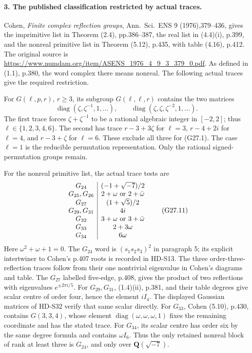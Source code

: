 \paragraph{3. The published classification restricted by actual traces.}
Cohen, \emph{Finite complex reflection groups},
Ann.\ Sci.\ ENS 9 (1976),379--436, gives the imprimitive list
in Theorem (2.4), pp.386--387, the real list in (4.4)(i),
p.399, and the nonreal primitive list in Theorem (5.12),
p.435, with table (4.16), p.412. The original source is
\url{https://www.numdam.org/item/ASENS_1976_4_9_3_379_0.pdf}.
As defined in (1.1), p.380, the word complex there means
nonreal. The following actual traces give the required restriction.

For \(G(\ell,p,r)\), \(r\ge3\), its subgroup
\(G(\ell,\ell,r)\) contains the two matrices
\[
 \operatorname{diag}(\zeta,\zeta^{-1},1,\ldots),\qquad
 \operatorname{diag}(\zeta,\zeta,\zeta^{-2},1,\ldots).
\]
The first trace forces \(\zeta+\zeta^{-1}\) to be a rational
algebraic integer in \([-2,2]\); thus
\(\ell\in\{1,2,3,4,6\}\).
The second has trace \(r-3+3\zeta\) for \(\ell=3\),
\(r-4+2i\) for \(\ell=4\), and \(r-3+\zeta\) for
\(\ell=6\). These exclude all three for (G27.1).
The case \(\ell=1\) is the reducible permutation representation.
Only the rational signed-permutation groups remain.

For the nonreal primitive list, the actual trace tests are
\[
\begin{array}{c|c}
G_{24}&(-1+\sqrt{-7})/2\\
G_{25},G_{26}&2+\omega\ \hbox{or }2+\bar\omega\\
G_{27}&(1+\sqrt5)/2\\
G_{29},G_{31}&4i\\
G_{32}&3+\omega\ \hbox{or }3+\bar\omega\\
G_{33}&2+3\omega\\
G_{34}&6\omega
\end{array}                                                    \tag{G27.11}
\]
Here \(\omega^2+\omega+1=0\).
The \(G_{24}\) word is \((s_1s_2s_3)^2\) in paragraph 5;
its explicit intertwiner to Cohen's p.407 roots is recorded
in HD-S13. The three order-three-reflection traces follow from
their one nontrivial eigenvalue in Cohen's diagrams and table.
The \(G_{27}\) labelled five-edge, p.408, gives the product
of two reflections with eigenvalues \(e^{\pm2\pi i/5}\).
For \(G_{29},G_{31}\), (1.4)(ii), p.381, and their table
degrees give scalar centre of order four, hence the element
\(iI_4\). The displayed Gaussian matrices of HD-S32 verify
that same scalar directly.
For \(G_{33}\), Cohen (5.10), p.430, contains
\(G(3,3,4)\), whose element
\(\operatorname{diag}(\omega,\omega,\omega,1)\) fixes the
remaining coordinate and has the stated trace.
For \(G_{34}\), its scalar centre has order six by the same
degree formula and contains \(\omega I_6\).
Thus the only retained nonreal block of rank at least three
is \(G_{24}\), and only over \(\mathbf Q(\sqrt{-7})\).

